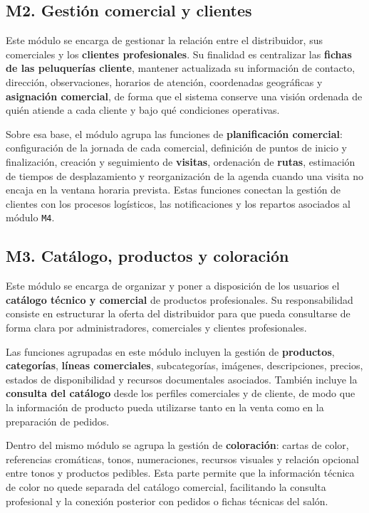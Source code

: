 \subsection{M2. Gestión comercial y clientes}

Este módulo se encarga de gestionar la relación entre el distribuidor, sus comerciales y los \textbf{clientes profesionales}. Su finalidad es centralizar las \textbf{fichas de las peluquerías cliente}, mantener actualizada su información de contacto, dirección, observaciones, horarios de atención, coordenadas geográficas y \textbf{asignación comercial}, de forma que el sistema conserve una visión ordenada de quién atiende a cada cliente y bajo qué condiciones operativas.

Sobre esa base, el módulo agrupa las funciones de \textbf{planificación comercial}: configuración de la jornada de cada comercial, definición de puntos de inicio y finalización, creación y seguimiento de \textbf{visitas}, ordenación de \textbf{rutas}, estimación de tiempos de desplazamiento y reorganización de la agenda cuando una visita no encaja en la ventana horaria prevista. Estas funciones conectan la gestión de clientes con los procesos logísticos, las notificaciones y los repartos asociados al módulo \texttt{M4}.

\subsection{M3. Catálogo, productos y coloración}

Este módulo se encarga de organizar y poner a disposición de los usuarios el \textbf{catálogo técnico y comercial} de productos profesionales. Su responsabilidad consiste en estructurar la oferta del distribuidor para que pueda consultarse de forma clara por administradores, comerciales y clientes profesionales.

Las funciones agrupadas en este módulo incluyen la gestión de \textbf{productos}, \textbf{categorías}, \textbf{líneas comerciales}, subcategorías, imágenes, descripciones, precios, estados de disponibilidad y recursos documentales asociados. También incluye la \textbf{consulta del catálogo} desde los perfiles comerciales y de cliente, de modo que la información de producto pueda utilizarse tanto en la venta como en la preparación de pedidos.

Dentro del mismo módulo se agrupa la gestión de \textbf{coloración}: cartas de color, referencias cromáticas, tonos, numeraciones, recursos visuales y relación opcional entre tonos y productos pedibles. Esta parte permite que la información técnica de color no quede separada del catálogo comercial, facilitando la consulta profesional y la conexión posterior con pedidos o fichas técnicas del salón.

